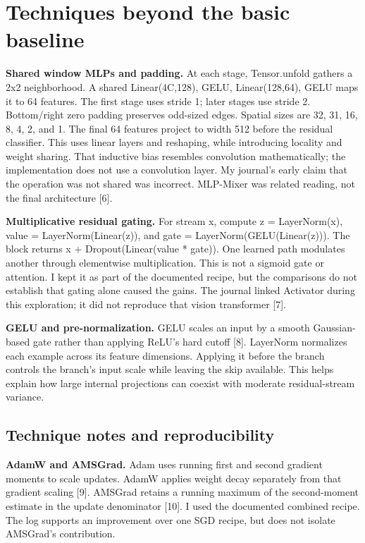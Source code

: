 \documentclass[journal,10pt,letterpaper]{IEEEtran}
\begin{document}
\section{Techniques beyond the basic baseline}

\textbf{Shared window MLPs and padding.} At each stage, Tensor.unfold gathers a 2x2 neighborhood. A shared Linear(4C,128), GELU, Linear(128,64), GELU maps it to 64 features. The first stage uses stride 1; later stages use stride 2. Bottom/right zero padding preserves odd-sized edges. Spatial sizes are 32, 31, 16, 8, 4, 2, and 1. The final 64 features project to width 512 before the residual classifier. This uses linear layers and reshaping, while introducing locality and weight sharing. That inductive bias resembles convolution mathematically; the implementation does not use a convolution layer. My journal's early claim that the operation was not shared was incorrect. MLP-Mixer was related reading, not the final architecture [6].

\textbf{Multiplicative residual gating.} For stream x, compute z = LayerNorm(x), value = LayerNorm(Linear(z)), and gate = LayerNorm(GELU(Linear(z))). The block returns x + Dropout(Linear(value * gate)). One learned path modulates another through elementwise multiplication. This is not a sigmoid gate or attention. I kept it as part of the documented recipe, but the comparisons do not establish that gating alone caused the gains. The journal linked Activator during this exploration; it did not reproduce that vision transformer [7].

\textbf{GELU and pre-normalization.} GELU scales an input by a smooth Gaussian-based gate rather than applying ReLU's hard cutoff [8]. LayerNorm normalizes each example across its feature dimensions. Applying it before the branch controls the branch's input scale while leaving the skip available. This helps explain how large internal projections can coexist with moderate residual-stream variance.



\subsection{Technique notes and reproducibility}

\textbf{AdamW and AMSGrad.} Adam uses running first and second gradient moments to scale updates. AdamW applies weight decay separately from that gradient scaling [9]. AMSGrad retains a running maximum of the second-moment estimate in the update denominator [10]. I used the documented combined recipe. The log supports an improvement over one SGD recipe, but does not isolate AMSGrad's contribution.
\end{document}

